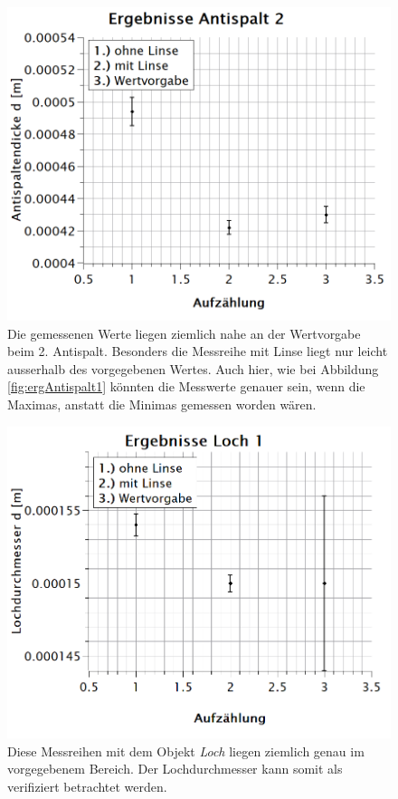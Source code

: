 \newpage
\begin{figure}
\centering
\includegraphics[width=\textwidth]{Bilder/ergebnisse_antispalt2.png} 
\caption[Ergebnisse Antispalt 2]{Die gemessenen Werte liegen ziemlich nahe an der Wertvorgabe beim 2. Antispalt. Besonders die Messreihe mit Linse liegt nur leicht ausserhalb des vorgegebenen Wertes. Auch hier, wie bei Abbildung \ref{fig:ergAntispalt1} könnten die Messwerte genauer sein, wenn die Maximas, anstatt die Minimas gemessen worden wären.}
\label{fig:ergAntispalt2}
\end{figure}
\newpage
\begin{figure}
\centering
\includegraphics[width=\textwidth]{Bilder/ergebnisse_loch1.png} 
\caption[Ergebnisse Loch 1]{Diese Messreihen mit dem Objekt \textit{Loch} liegen ziemlich genau im vorgegebenem Bereich. Der Lochdurchmesser kann somit als verifiziert betrachtet werden.}
\label{fig:ergLoch1}
\end{figure}
